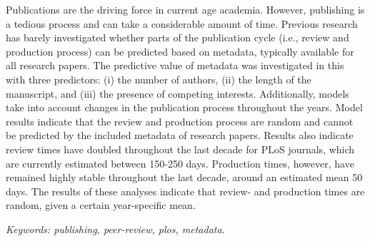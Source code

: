 Publications are the driving force in current age academia. However, publishing is a tedious process and can take a considerable amount of time. Previous research has barely investigated whether parts of the publication cycle (i.e., review and production process) can be predicted based on metadata, typically available for all research papers. The predictive value of metadata was investigated in this with three predictors: (i) the number of authors, (ii) the length of the manuscript, and (iii) the presence of competing interests. Additionally, models take into account changes in the publication process throughout the years. Model results indicate that the review and production process are random and cannot be predicted by the included metadata of research papers. Results also indicate review times have doubled throughout the last decade for PLoS journals, which are currently estimated between 150-250 days. Production times, however, have remained highly stable throughout the last decade, around an estimated mean 50 days. The results of these analyses indicate that review- and production times are random, given a certain year-specific mean.
  
\textit{Keywords: publishing, peer-review, plos, metadata.}
  